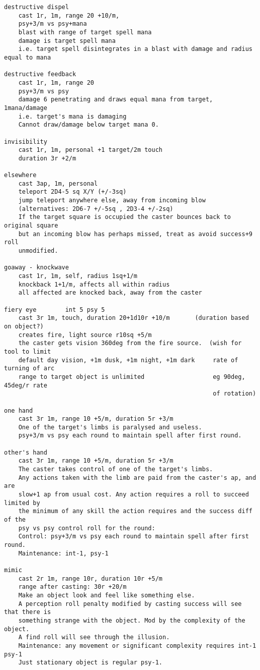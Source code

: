 \small \begin{verbatim}
destructive dispel
    cast 1r, 1m, range 20 +10/m, 
    psy+3/m vs psy+mana
    blast with range of target spell mana
    damage is target spell mana
    i.e. target spell disintegrates in a blast with damage and radius equal to mana

destructive feedback
    cast 1r, 1m, range 20
    psy+3/m vs psy
    damage 6 penetrating and draws equal mana from target, 1mana/damage
    i.e. target's mana is damaging
    Cannot draw/damage below target mana 0.

invisibility
    cast 1r, 1m, personal +1 target/2m touch
    duration 3r +2/m

elsewhere
    cast 3ap, 1m, personal
    teleport 2D4-5 sq X/Y (+/-3sq)
    jump teleport anywhere else, away from incoming blow
    (alternatives: 2D6-7 +/-5sq , 2D3-4 +/-2sq)
    If the target square is occupied the caster bounces back to original square
    but an incoming blow has perhaps missed, treat as avoid success+9 roll
    unmodified.

goaway - knockwave
    cast 1r, 1m, self, radius 1sq+1/m
    knockback 1+1/m, affects all within radius
    all affected are knocked back, away from the caster

fiery eye        int 5 psy 5
    cast 3r 1m, touch, duration 20+1d10r +10/m       (duration based on object?)
    creates fire, light source r10sq +5/m
    the caster gets vision 360deg from the fire source.  (wish for tool to limit
    default day vision, +1m dusk, +1m night, +1m dark     rate of turning of arc
    range to target object is unlimited                   eg 90deg, 45deg/r rate
                                                          of rotation)

one hand
    cast 3r 1m, range 10 +5/m, duration 5r +3/m
    One of the target's limbs is paralysed and useless.
    psy+3/m vs psy each round to maintain spell after first round.
    
other's hand
    cast 3r 1m, range 10 +5/m, duration 5r +3/m
    The caster takes control of one of the target's limbs.
    Any actions taken with the limb are paid from the caster's ap, and are
    slow+1 ap from usual cost. Any action requires a roll to succeed limited by
    the minimum of any skill the action requires and the success diff of the 
    psy vs psy control roll for the round:
    Control: psy+3/m vs psy each round to maintain spell after first round.
    Maintenance: int-1, psy-1

mimic
    cast 2r 1m, range 10r, duration 10r +5/m
    range after casting: 30r +20/m
    Make an object look and feel like something else.
    A perception roll penalty modified by casting success will see that there is
    something strange with the object. Mod by the complexity of the object.
    A find roll will see through the illusion.
    Maintenance: any movement or significant complexity requires int-1 psy-1
    Just stationary object is regular psy-1.


\end{verbatim}
